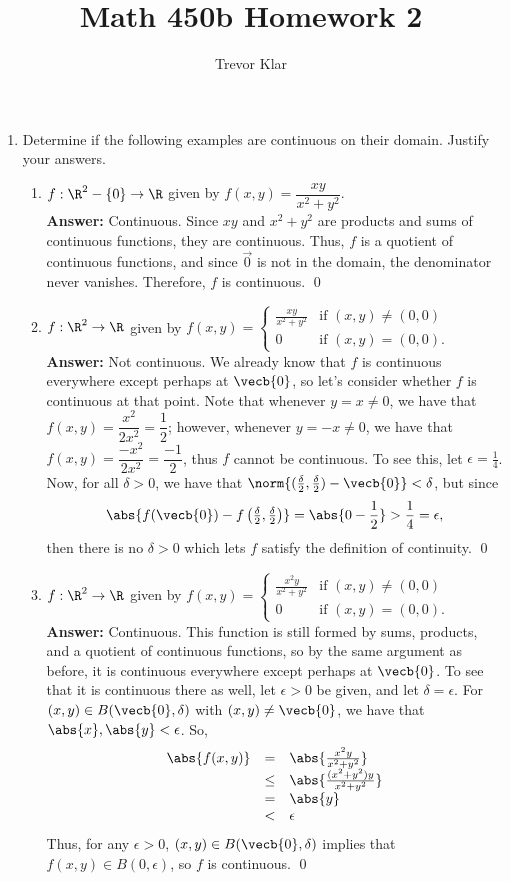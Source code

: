 \documentclass[letterpaper]{article}
\title{Math 450b \linebreak
Homework 2}
\author{Trevor Klar}
\begin{document}
\maketitle

\begin{enumerate}
\item Determine if the following examples are continuous on their domain. Justify your answers. 
	\begin{enumerate}
	\item $f:\R^2-\{0\}\to \R$ given by $f(x,y)=\dfrac{xy}{x^2+y^2}.$\\
	\textbf{Answer:} Continuous. Since $xy$ and $x^2+y^2$ are products and sums of continuous functions, they are continuous. Thus, $f$ is a quotient of continuous functions, and since $\vec{0}$ is not in the domain, the denominator never vanishes. Therefore, $f$ is continuous. \qed
	\item $f:\R^2\to \R$ given by $f(x,y)=
	\begin{cases}
	\frac{xy}{x^2+y^2} & \text{if } (x,y)\neq(0,0)\\
	0 & \text{if } (x,y)=(0,0).
	\end{cases}$\\
	\textbf{Answer:} Not continuous. We already know that $f$ is continuous everywhere except perhaps at $\vecb{0}$, so let's consider whether $f$ is continuous at that point. Note that whenever $y=x\neq0$, we have that $f(x,y)=\dfrac{x^2}{2x^2}=\dfrac{1}{2}$; however, whenever $y=-x\neq0$, we have that $f(x,y)=\dfrac{-x^2}{2x^2}=\dfrac{-1}{2}$, thus $f$ cannot be continuous. To see this, let $\epsilon=\frac{1}{4}$. Now, for all $\delta>0$, we have that $\norm{(\frac{\delta}{2},\frac{\delta}{2})-\vecb{0}} < \delta$, but since 
	$$\abs{f(\vecb{0})-f\left(\tfrac{\delta}{2},\tfrac{\delta}{2}\right)}=\abs{0-\frac{1}{2}}>\frac{1}{4}=\epsilon,$$
	then there is no $\delta>0$ which lets $f$ satisfy the definition of continuity. \qed
	\item $f:\R^2\to \R$ given by $f(x,y)=
	\begin{cases}
	\frac{x^2y}{x^2+y^2} & \text{if } (x,y)\neq(0,0)\\
	0 & \text{if } (x,y)=(0,0).
	\end{cases}$\\
	\textbf{Answer: } Continuous. This function is still formed by sums, products, and a quotient of continuous functions, so by the same argument as before, it is continuous everywhere except perhaps at $\vecb{0}$. To see that it is continuous there as well, let $\epsilon>0$ be given, and let $\delta=\epsilon$. For $(x,y)\in B(\vecb{0},\delta)$ with $(x,y)\neq\vecb{0}$, we have that $\abs{x}, \abs{y} < \epsilon$. So, 
	\[\begin{array}{rcl}
	\abs{f(x,y)} &=& \abs{\frac{x^2y}{x^2+y^2}}\\
	&\leq& \abs{\frac{(x^2+y^2)y}{x^2+y^2}}\\
	&=& \abs{y}\\
	&<& \epsilon
	\end{array}\]
	Thus, for any $\epsilon>0$, $(x,y)\in B(\vecb{0},\delta)$ implies that $f(x,y)\in B(0,\epsilon)$, so $f$ is continuous. \qed
	\end{enumerate}


\end{enumerate}
\end{document}

